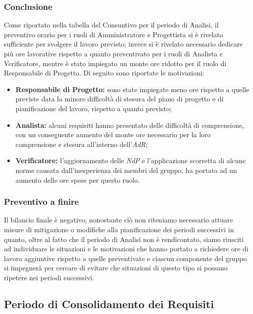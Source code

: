 	\subsubsection{Conclusione}
		Come riportato nella tabella del Consuntivo per il periodo di Analisi, il preventivo orario per i ruoli di Amministratore e Progettista si è rivelato sufficiente per svolgere il lavoro previsto; invece si è rivelato necessario dedicare più ore lavorative rispetto a quanto preventivato per i ruoli di Analista e Verificatore, mentre è stato impiegato un monte ore ridotto per il ruolo di Responsabile di Progetto. Di seguito sono riportate le motivazioni:
		\begin{itemize}
			\item \textbf{Responsabile di Progetto:} sono state impiegate meno ore rispetto a quelle previste data la minore difficoltà di stesura del piano di progetto e di pianificazione del lavoro, rispetto a quanto previsto;
			\item \textbf{Analista:} alcuni requisiti hanno presentato delle difficoltà di comprensione, con un conseguente aumento del monte ore necessario per la loro comprensione e stesura all'interno dell'\textit{AdR{}};
			\item \textbf{Verificatore:} l'aggiornamento delle \textit{NdP{}} e l'applicazione scorretta di alcune norme causata dall'inesperienza dei membri del gruppo, ha portato ad un aumento delle ore spese per questo ruolo.
		\end{itemize}

	\subsubsection{Preventivo a finire}
	Il bilancio finale è negativo; nonostante ciò non riteniamo necessario attuare misure di mitigazione o modifiche alla pianificazione dei periodi successivi in quanto, oltre al fatto che il periodo di Analisi non è rendicontato, siamo riusciti ad individuare le situazioni e le motivazioni che hanno portato a richiedere ore di lavoro aggiuntive rispetto a quelle preventivate e ciascun componente del gruppo si impegnerà per cercare di evitare che situazioni di questo tipo si possano ripetere nei periodi successivi.

\subsection{Periodo di Consolidamento dei Requisiti}
